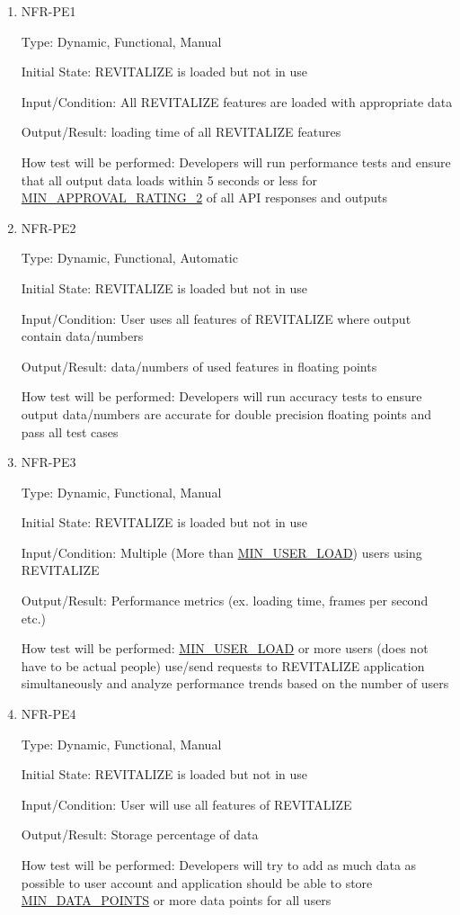 \documentclass[12pt, titlepage]{article}
\begin{document}
\begin{enumerate}
	
	\item{NFR-PE1\\}
	
	Type: Dynamic, Functional, Manual
	
	Initial State: REVITALIZE is loaded but not in use
	
	Input/Condition: All REVITALIZE features are loaded with appropriate data
	
	Output/Result: loading time of all REVITALIZE features
	
	How test will be performed: Developers will run performance tests and ensure that all output data loads within 5 seconds or less for \hyperlink{MIN_APPROVAL_RATING_2}{MIN\_APPROVAL\_RATING\_2} of all API responses and outputs
	
	\item{NFR-PE2\\}
	
	Type: Dynamic, Functional, Automatic
	
	Initial State: REVITALIZE is loaded but not in use
	
	Input/Condition: User uses all features of REVITALIZE where output contain data/numbers
	
	Output/Result: data/numbers of used features in floating points
	
	How test will be performed: Developers will run accuracy tests to ensure output data/numbers are accurate for double precision floating points and pass all test cases
	
	\item{NFR-PE3\\}
	
	Type: Dynamic, Functional, Manual
	
	Initial State: REVITALIZE is loaded but not in use
	
	Input/Condition: Multiple (More than \hyperlink{MIN_USER_LOAD}{MIN\_USER\_LOAD}) users using REVITALIZE
	
	Output/Result: Performance metrics (ex. loading time, frames per second etc.)
	
	How test will be performed: \hyperlink{MIN_USER_LOAD}{MIN\_USER\_LOAD} or more users (does not have to be actual people) use/send requests to REVITALIZE application simultaneously and analyze performance trends based on the number of users
	
	\item{NFR-PE4\\}
	
	Type: Dynamic, Functional, Manual
	
	Initial State: REVITALIZE is loaded but not in use
	
	Input/Condition: User will use all features of REVITALIZE
	
	Output/Result: Storage percentage of data
	
	How test will be performed: Developers will try to add as much data as possible to user account and application should be able to store \hyperlink{MIN_DATA_POINTS}{MIN\_DATA\_POINTS} or more data points for all users
	
\end{enumerate}
\end{document}
